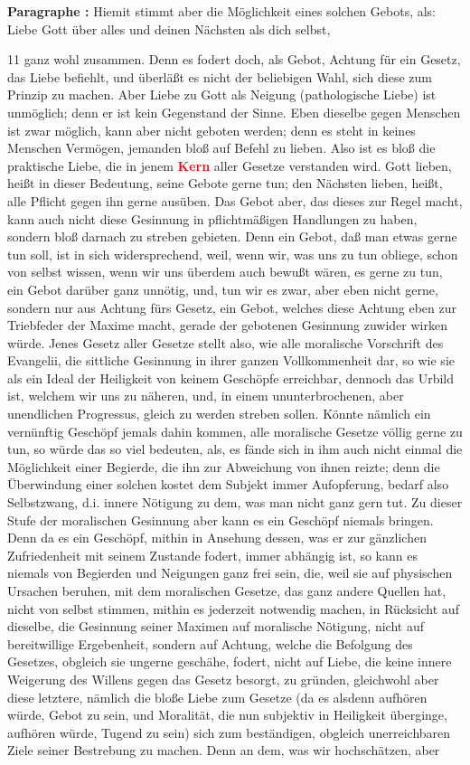 \documentclass[a4paper,12pt,twoside]{book}
\newcommand{\match}[1]{\textcolor{red}{\textbf{#1}}}
\begin{document}
	\textbf{Paragraphe : }Hiemit stimmt aber die Möglichkeit eines solchen Gebots, als: Liebe Gott über alles und deinen Nächsten als dich selbst,
	
	
	11
	ganz wohl zusammen. Denn es fodert doch, als Gebot, Achtung für ein Gesetz, das Liebe befiehlt, und überläßt es nicht der beliebigen Wahl, sich diese zum Prinzip zu machen. Aber Liebe zu Gott als Neigung (pathologische Liebe) ist unmöglich; denn er ist kein Gegenstand der Sinne. Eben dieselbe gegen Menschen ist zwar möglich, kann aber nicht geboten werden; denn es steht in keines Menschen Vermögen, jemanden bloß auf Befehl zu lieben. Also ist es bloß die praktische Liebe, die in jenem \match{Kern} aller Gesetze verstanden wird. Gott lieben, heißt in dieser Bedeutung, seine Gebote gerne tun; den Nächsten lieben, heißt, alle Pflicht gegen ihn gerne ausüben. Das Gebot aber, das dieses zur Regel macht, kann auch nicht diese Gesinnung in pflichtmäßigen Handlungen zu haben, sondern bloß darnach zu streben gebieten. Denn ein Gebot, daß man etwas gerne tun soll, ist in sich widersprechend, weil, wenn wir, was uns zu tun obliege, schon von selbst wissen, wenn wir uns überdem auch bewußt wären, es gerne zu tun, ein Gebot darüber ganz unnötig, und, tun wir es zwar, aber eben nicht gerne, sondern nur aus Achtung fürs Gesetz, ein Gebot, welches diese Achtung eben zur Triebfeder der Maxime macht, gerade der gebotenen Gesinnung zuwider wirken würde. Jenes Gesetz aller Gesetze stellt also, wie alle moralische Vorschrift des Evangelii, die sittliche  Gesinnung in ihrer ganzen Vollkommenheit dar, so wie sie als ein Ideal der Heiligkeit von keinem Geschöpfe erreichbar, dennoch das Urbild ist, welchem wir uns zu näheren, und, in einem ununterbrochenen, aber unendlichen Progressus, gleich zu werden streben sollen. Könnte nämlich ein vernünftig Geschöpf jemals dahin kommen, alle moralische Gesetze völlig gerne zu tun, so würde das so viel bedeuten, als, es fände sich in ihm auch nicht einmal die Möglichkeit einer Begierde, die ihn zur Abweichung von ihnen reizte; denn die Überwindung einer solchen kostet dem Subjekt immer Aufopferung, bedarf also Selbstzwang, d.i. innere Nötigung zu dem, was man nicht ganz gern tut. Zu dieser Stufe der moralischen Gesinnung aber kann es ein Geschöpf niemals bringen. Denn da es ein Geschöpf, mithin in Ansehung dessen, was er zur gänzlichen Zufriedenheit mit seinem Zustande fodert, immer abhängig ist, so kann es niemals von Begierden und Neigungen ganz frei sein, die, weil sie auf physischen Ursachen beruhen, mit dem moralischen Gesetze, das ganz andere Quellen hat, nicht von selbst stimmen, mithin es jederzeit notwendig machen, in Rücksicht auf dieselbe, die Gesinnung seiner Maximen auf moralische Nötigung, nicht auf bereitwillige Ergebenheit, sondern auf Achtung, welche die Befolgung des Gesetzes, obgleich sie ungerne geschähe, fodert, nicht auf Liebe, die keine innere Weigerung des Willens gegen das Gesetz besorgt, zu gründen, gleichwohl aber diese letztere, nämlich die bloße Liebe zum Gesetze (da es alsdenn aufhören würde, Gebot zu sein, und Moralität, die nun subjektiv in Heiligkeit überginge, aufhören würde, Tugend zu sein) sich zum beständigen, obgleich unerreichbaren Ziele seiner Bestrebung zu machen. Denn an dem, was wir hochschätzen, aber 
\end{document}
